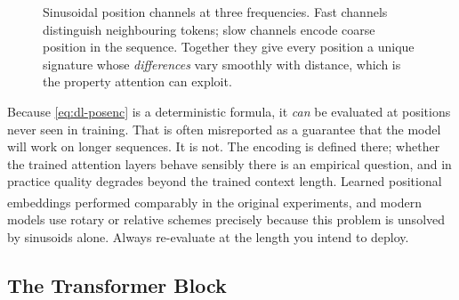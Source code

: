 \begin{figure}[htbp]
\centering
{}
\caption{Sinusoidal position channels at three frequencies. Fast channels
distinguish neighbouring tokens; slow channels encode coarse position in the
sequence. Together they give every position a unique signature whose
\emph{differences} vary smoothly with distance, which is the property attention
can exploit.}
\label{fig:dl-positional-encoding}
\end{figure}

\begin{cautionbox}
Because \cref{eq:dl-posenc} is a deterministic formula, it \emph{can} be
evaluated at positions never seen in training. That is often misreported as a
guarantee that the model will work on longer sequences. It is not. The encoding
is defined there; whether the trained attention layers behave sensibly there is
an empirical question, and in practice quality degrades beyond the trained
context length. Learned positional embeddings performed comparably in the
original experiments\textsuperscript{\cite[][p.~6]{vaswaniAttentionAllYou2023}},
and modern models use rotary or relative schemes precisely because this problem
is unsolved by sinusoids alone. Always re-evaluate at the length you intend to
deploy.
\end{cautionbox}

\subsection{The Transformer Block}

